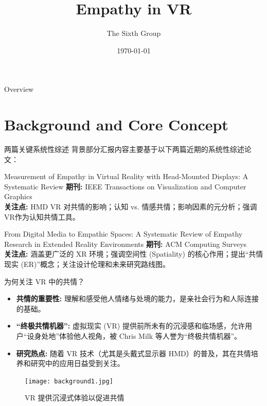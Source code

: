 \documentclass[aspectratio=169,xcolor=dvipsnames]{beamer}
\title{Empathy in VR}
\author{The Sixth Group}
\date{\today} %
\begin{document}
\begin{frame}
    \titlepage
\end{frame}

\begin{frame}{Overview}
    \tableofcontents
\end{frame}

\section{Background and Core Concept}
\begin{frame}{两篇关键系统性综述}
    背景部分汇报内容主要基于以下两篇近期的系统性综述论文：

    \begin{block}{Measurement of Empathy in Virtual Reality with Head-Mounted Displays: A Systematic Review\cite{lee2024measurement}}
        \textbf{期刊:} IEEE Transactions on Visualization and Computer Graphics \\
        \textbf{关注点:} HMD VR 对共情的影响；认知 vs. 情感共情；影响因素的\alert{元分析}；强调VR作为认知共情工具。
    \end{block}

    \begin{block}{From Digital Media to Empathic Spaces: A Systematic Review of Empathy Research in Extended Reality Environments\cite{paananen2022digital}}
         \textbf{期刊:} ACM Computing Surveys \\
         \textbf{关注点:} 涵盖更广泛的 \alert{XR 环境}；强调\alert{空间性 (Spatiality)} 的核心作用；提出“共情现实 (ER)”概念；关注设计伦理和未来研究路线图。
    \end{block}
\end{frame}
\begin{frame}{为何关注 VR 中的共情？}
    \begin{itemize}
        \item \textbf{共情的重要性:} 理解和感受他人情绪与处境的能力，是亲社会行为和人际连接的基础。
        \item \textbf{“终极共情机器”:} 虚拟现实 (VR) 提供前所未有的\alert{沉浸感}和\alert{临场感}，允许用户“设身处地”体验他人视角，被 Chris Milk 等人誉为“终极共情机器”。
        \item \textbf{研究热点:} 随着 VR 技术（尤其是头戴式显示器 HMD）的普及，其在共情培养和研究中的应用日益受到关注。
    \end{itemize}
    \begin{figure}
        \texttt{[image: background1.jpg]}
        \caption{VR 提供沉浸式体验以促进共情}
    \end{figure}
\end{frame}
\end{document}
